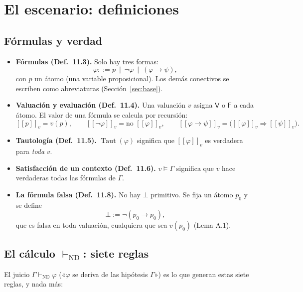 \documentclass[11pt,a4paper]{article}
\newcommand{\Provnd}{\vdash_{\mathrm{ND}}}
\newcommand{\Imp}{\rightarrow}
\newcommand{\Not}{\neg}
\newcommand{\sem}[1]{[\![#1]\!]}
\newcommand{\Taut}{\operatorname{Taut}}
\newcommand{\V}{\mathsf{V}}
\newcommand{\F}{\mathsf{F}}
\begin{document}
\section{El escenario: definiciones}

\subsection{Fórmulas y verdad}

\begin{itemize}
  \item \textbf{Fórmulas (Def.~11.3).} Solo hay tres formas:
    \[\varphi::=p\ \mid\ \Not\varphi\ \mid\ (\varphi\Imp\psi),\]
    con \(p\) un átomo (una variable proposicional). Los demás conectivos se
    escriben como abreviaturas (Sección~\ref{sec:base}).
  \item \textbf{Valuación y evaluación (Def.~11.4).} Una valuación \(v\)
    asigna \(\V\) o \(\F\) a cada átomo. El valor de una fórmula se calcula por
    recursión:
    \[
    \sem{p}_v=v(p),\qquad
    \sem{\Not\varphi}_v=\text{no }\sem{\varphi}_v,\qquad
    \sem{\varphi\Imp\psi}_v=\big(\sem{\varphi}_v\Rightarrow\sem{\psi}_v\big).
    \]
  \item \textbf{Tautología (Def.~11.5).} \(\Taut(\varphi)\) significa que
    \(\sem\varphi_v\) es verdadera para \emph{toda} \(v\).
  \item \textbf{Satisfacción de un contexto (Def.~11.6).} \(v\models\Gamma\)
    significa que \(v\) hace verdaderas todas las fórmulas de \(\Gamma\).
  \item \textbf{La fórmula falsa (Def.~11.8).} No hay \(\bot\) primitivo. Se
    fija un átomo \(p_0\) y se define
    \[\bot:=\Not(p_0\Imp p_0),\]
    que es falsa en toda valuación, cualquiera que sea \(v(p_0)\) (Lema A.1).
\end{itemize}

\subsection{\texorpdfstring{El cálculo \(\Provnd\): siete reglas}{El cálculo ND: siete reglas}}

El juicio \(\Gamma\Provnd\varphi\) («\(\varphi\) se deriva de las hipótesis
\(\Gamma\)») es lo que generan estas siete reglas, y nada más:
\end{document}
